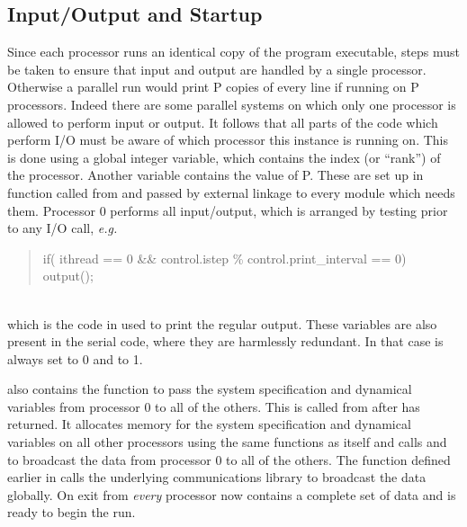 \documentclass[a4paper,twoside]{report}
\newcommand{\eg}{\emph{e.g.}}
\begin{document}
\subsection{Input/Output and Startup}
\label{sec:pario}

Since each processor runs an identical copy of the program executable,
steps must be taken to ensure that input and output are handled by a
single processor.  Otherwise a parallel run would print P copies of
every line if running on P processors.  Indeed there are some parallel
systems on which only one processor is allowed to perform input or
output. It follows that all parts of the code which perform I/O must
be aware of which processor this instance is running on.  This is done
using a global integer variable,  which contains
the index (or ``rank'') of the processor.  Another variable
 contains the value of P.  These are set up in
function  called from  and passed
by external linkage to every module which needs them.  Processor 0
performs all input/output, which is arranged by testing
 prior to any I/O call, \eg\\
\parbox{\textwidth}{%
\begin{quote}
  \Litf
      if( ithread == 0 \&\& control.istep \% control.print\_interval == 0)\\
\hspace*{1cm}          output();
\end{quote}}\\
which is the code in  used to print the regular output.
These variables are also present in the serial code, where they are
harmlessly redundant. In that case  is always set to 0
and  to 1.

 also contains the function  to
pass the system specification and dynamical variables from processor 0
to all of the others.  This is called from  after
 has returned.  It allocates memory for the system
specification and dynamical variables on all other processors using
the same functions as  itself and calls
 and  to broadcast the
data from processor 0 to all of the others.  The function
 defined earlier in 
calls the underlying communications library to broadcast the
data globally.  On exit from  \emph{every}
processor now contains a complete set of data and is ready to begin
the run.
\end{document}
